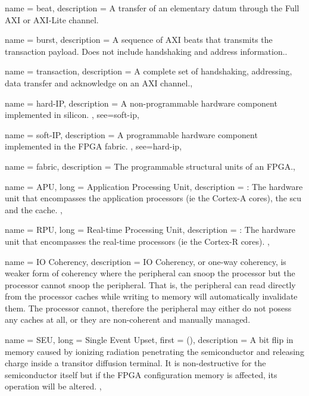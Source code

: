 {
	name = {beat},
	description = {A transfer of an elementary datum through the Full AXI or AXI-Lite channel.}
}

{
	name = {burst},
	description = {A sequence of AXI \Glspl{beat} that transmits the \gls{transaction} payload.
	Does not include handshaking and address information.}.
}

{
	name = {transaction},
	description = {A complete set of handshaking, addressing, data transfer and acknowledge on
	an AXI channel.},
}


{
	name = {hard-IP},
	description = {
		A non-programmable hardware component implemented in silicon.
	},
	see={soft-ip},
}

{
	name = {soft-IP},
	description = {
		A programmable hardware component implemented in the FPGA \gls{fabric}.
	},
	see={hard-ip},
}

{
	name = {fabric},
	description = {The programmable structural units of an FPGA.},
}

{
	name = {APU},
	long = {Application Processing Unit},
	description = {\emph{}:
		The hardware unit that encompasses the application processors (ie the Cortex-A cores),
		the \gls{scu} and the cache.
	},
}

{
	name = {RPU},
	long = {Real-time Processing Unit},
	description = {\emph{}:
		The hardware unit that encompasses the real-time processors (ie the Cortex-R cores).
	},
}


{
	name = {IO Coherency},
	description = {
		IO Coherency, or one-way coherency, is weaker form of coherency where
		the peripheral can snoop the processor but the processor cannot snoop the peripheral.
		That is, the peripheral can read directly from the processor caches while
		writing to memory will automatically invalidate them. The processor cannot,
		therefore the peripheral may either do not posess any caches at all, or they
		are non-coherent and manually managed.
	}
}


{
	name = {SEU},
	long = {Single Event Upset},
	first = { ()},
	description = {
		A bit flip in memory caused by ionizing radiation penetrating the semiconductor 
		and releasing charge inside a transitor diffusion terminal. It is non-destructive
		for the semiconductor itself but if the FPGA configuration memory is affected,
		its operation will be altered.
	},
}

